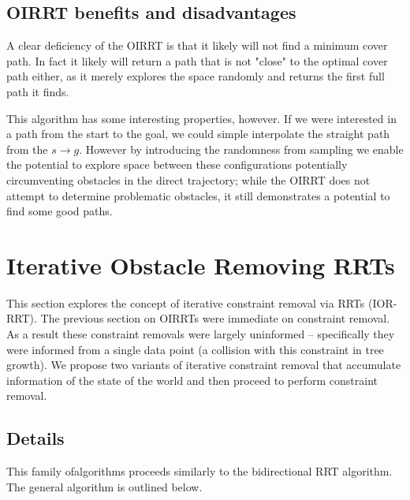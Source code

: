 \subsection{OIRRT benefits and disadvantages}
A clear deficiency of the OIRRT is that it likely will not find a minimum cover path. In fact it likely will return a path that is not "close" to the optimal cover path either, as it merely explores the space randomly and returns the first full path it finds.

This algorithm has some interesting properties, however. If we were interested in a path from the start to the goal, we could simple interpolate the straight path from the $s \rightarrow g$. However by introducing the randomness from sampling we enable the potential to explore space between these configurations potentially circumventing obstacles in the direct trajectory; while the OIRRT does not attempt to determine problematic obstacles, it still demonstrates a potential to find some good paths.

\section{Iterative Obstacle Removing RRTs}
This section explores the concept of iterative constraint removal via RRTs (IOR-RRT). The previous section on OIRRTs were immediate on constraint removal. As a result these constraint removals were largely uninformed -- specifically they were informed from a single data point (a collision with this constraint in tree growth). We propose two variants of iterative constraint removal that accumulate information of the state of the world and then proceed to perform constraint removal.

\subsection{Details}
This family ofalgorithms proceeds similarly to the bidirectional RRT algorithm. The general algorithm is outlined below.

